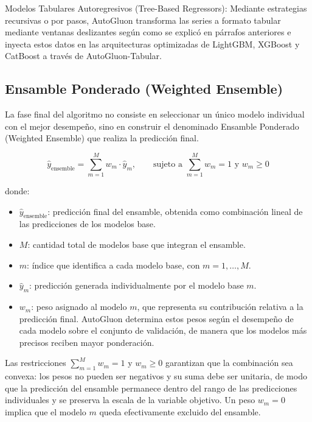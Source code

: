 Modelos Tabulares Autoregresivos (Tree-Based Regressors): Mediante estrategias recursivas o por pasos, AutoGluon transforma las series a formato tabular mediante ventanas deslizantes según como se explicó en párrafos anteriores e inyecta estos datos en las arquitecturas optimizadas de LightGBM, XGBoost y CatBoost a través de AutoGluon-Tabular.

\subsection{Ensamble Ponderado (Weighted Ensemble)}\label{ensamble-ponderado-weighted-ensemble}

La fase final del algoritmo no consiste en seleccionar un único modelo individual con el mejor desempeño, sino en construir el denominado Ensamble Ponderado (Weighted Ensemble) que realiza la predicción final.

\begin{equation}
\hat{y}_{\text{ensemble}} = \sum_{m=1}^{M} w_m \cdot \hat{y}_m,
\qquad \text{sujeto a } \sum_{m=1}^{M} w_m = 1 \text{ y } w_m \geq 0
\label{eq:ensamble-ponderado}
\end{equation}

donde:

\begin{itemize}
  \item $\hat{y}_{\text{ensemble}}$: predicción final del ensamble, obtenida como combinación lineal de las predicciones de los modelos base.
  \item $M$: cantidad total de modelos base que integran el ensamble.
  \item $m$: índice que identifica a cada modelo base, con $m = 1, \dots, M$.
  \item $\hat{y}_m$: predicción generada individualmente por el modelo base $m$.
  \item $w_m$: peso asignado al modelo $m$, que representa su contribución relativa a la predicción final. AutoGluon determina estos pesos según el desempeño de cada modelo sobre el conjunto de validación, de manera que los modelos más precisos reciben mayor ponderación.
\end{itemize}

Las restricciones $\sum_{m=1}^{M} w_m = 1$ y $w_m \geq 0$ garantizan que la combinación sea convexa: los pesos no pueden ser negativos y su suma debe ser unitaria, de modo que la predicción del ensamble permanece dentro del rango de las predicciones individuales y se preserva la escala de la variable objetivo. Un peso $w_m = 0$ implica que el modelo $m$ queda efectivamente excluido del ensamble.

